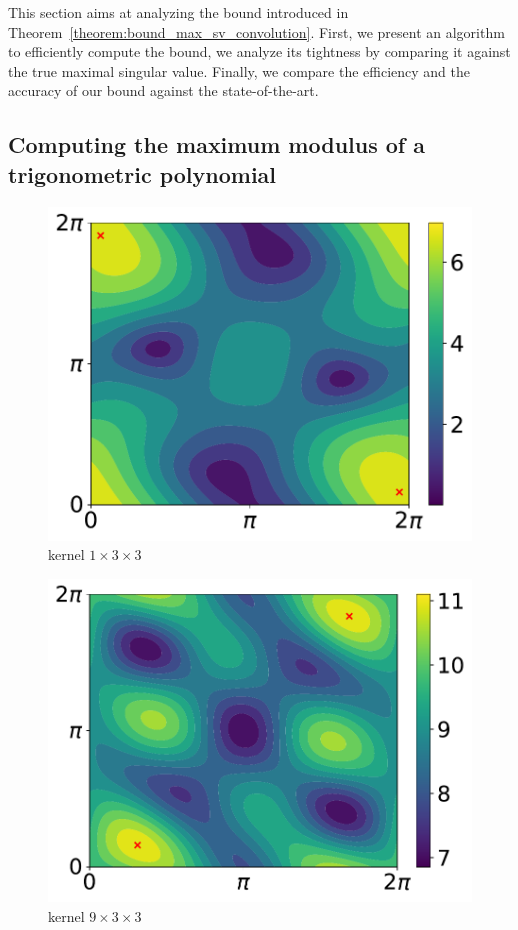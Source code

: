 This section aims at analyzing the bound introduced in Theorem~\ref{theorem:bound_max_sv_convolution}.
First, we present an algorithm to efficiently compute the bound, we analyze its tightness by comparing it against the true maximal singular value.
Finally, we compare the efficiency and the accuracy of our bound against the state-of-the-art. 

\subsection{Computing the maximum modulus of a trigonometric polynomial}\label{subsection:computing_max_modulus_trig_polynomial}


\begin{figure}[htb]
  \centering
  \begin{minipage}{.24\linewidth}
    \centering
    \includegraphics[scale=0.23]{figures/chapter4/contour_poly_200_1_1_3.pdf}\\kernel $1\times3\times3$
  \end{minipage}
  \begin{minipage}{.24\linewidth}
      \centering
      \includegraphics[scale=0.23]{figures/chapter4/contour_poly_200_1_9_3.pdf}\\kernel $9\times3\times3$

\end{minipage}
\end{figure}
